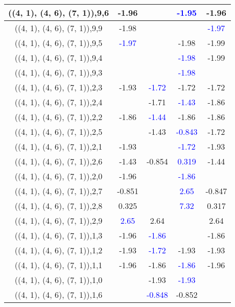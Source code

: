 \documentclass{article}
\begin{document}
\begin{center}
\begin{longtable}{|c|c|c|c|c|}
        	\hline
        	((4, 1), (4, 6), (7, 1)),9,6&-1.96&& \textcolor{blue}{-1.95}&-1.96\\
        	\hline
        	((4, 1), (4, 6), (7, 1)),9,9&-1.98&&& \textcolor{blue}{-1.97}\\
        	\hline
        	((4, 1), (4, 6), (7, 1)),9,5& \textcolor{blue}{-1.97}&&-1.98&-1.99\\
        	\hline
        	((4, 1), (4, 6), (7, 1)),9,4&&& \textcolor{blue}{-1.98}&-1.99\\
        	\hline
        	((4, 1), (4, 6), (7, 1)),9,3&&& \textcolor{blue}{-1.98}&\\
        	\hline
        	((4, 1), (4, 6), (7, 1)),2,3&-1.93& \textcolor{blue}{-1.72}&-1.72&-1.72\\
        	\hline
        	((4, 1), (4, 6), (7, 1)),2,4&&-1.71& \textcolor{blue}{-1.43}&-1.86\\
        	\hline
        	((4, 1), (4, 6), (7, 1)),2,2&-1.86& \textcolor{blue}{-1.44}&-1.86&-1.86\\
        	\hline
        	((4, 1), (4, 6), (7, 1)),2,5&&-1.43& \textcolor{blue}{-0.843}&-1.72\\
        	\hline
        	((4, 1), (4, 6), (7, 1)),2,1&-1.93&& \textcolor{blue}{-1.72}&-1.93\\
        	\hline
        	((4, 1), (4, 6), (7, 1)),2,6&-1.43&-0.854& \textcolor{blue}{0.319}&-1.44\\
        	\hline
        	((4, 1), (4, 6), (7, 1)),2,0&-1.96&& \textcolor{blue}{-1.86}&\\
        	\hline
        	((4, 1), (4, 6), (7, 1)),2,7&-0.851&& \textcolor{blue}{2.65}&-0.847\\
        	\hline
        	((4, 1), (4, 6), (7, 1)),2,8&0.325&& \textcolor{blue}{7.32}&0.317\\
        	\hline
        	((4, 1), (4, 6), (7, 1)),2,9& \textcolor{blue}{2.65}&2.64&&2.64\\
        	\hline
        	((4, 1), (4, 6), (7, 1)),1,3&-1.96& \textcolor{blue}{-1.86}&&-1.86\\
        	\hline
        	((4, 1), (4, 6), (7, 1)),1,2&-1.93& \textcolor{blue}{-1.72}&-1.93&-1.93\\
        	\hline
        	((4, 1), (4, 6), (7, 1)),1,1&-1.96&-1.86& \textcolor{blue}{-1.86}&-1.96\\
        	\hline
        	((4, 1), (4, 6), (7, 1)),1,0&&-1.93& \textcolor{blue}{-1.93}&\\
        	\hline
        	((4, 1), (4, 6), (7, 1)),1,6&& \textcolor{blue}{-0.848}&-0.852&\\

\end{longtable}
\end{center}
\end{document}
